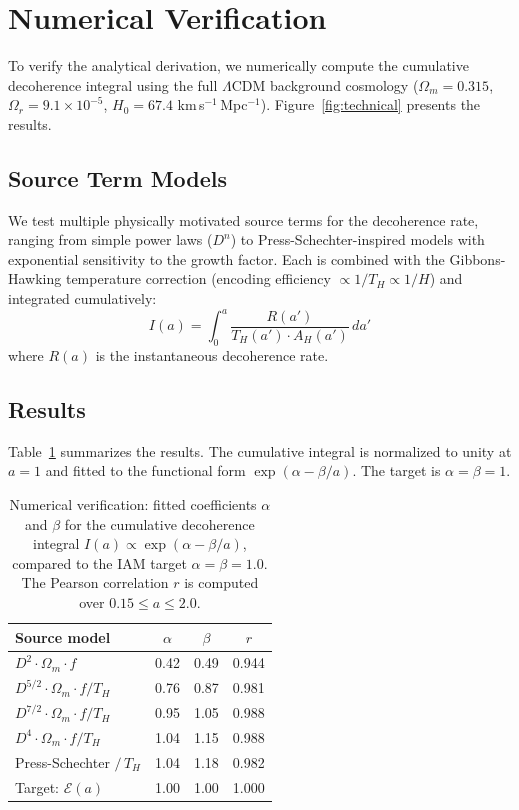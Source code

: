 \documentclass[twocolumn,superscriptaddress,prl,amsmath,amssymb]{revtex4-2}
\begin{document}
\section{Numerical Verification}
\label{sec:numerical}

To verify the analytical derivation, we numerically compute the cumulative decoherence integral using the full $\Lambda$CDM background cosmology ($\Omega_m = 0.315$, $\Omega_r = 9.1 \times 10^{-5}$, $H_0 = 67.4$ km\,s$^{-1}$\,Mpc$^{-1}$). Figure~\ref{fig:technical} presents the results.

\subsection{Source Term Models}

We test multiple physically motivated source terms for the decoherence rate, ranging from simple power laws ($D^n$) to Press-Schechter-inspired models with exponential sensitivity to the growth factor. Each is combined with the Gibbons-Hawking temperature correction (encoding efficiency $\propto 1/T_H \propto 1/H$) and integrated cumulatively:
\begin{equation}
I(a) = \int_0^a \frac{R(a')}{T_H(a') \cdot A_H(a')} \, da'
\end{equation}
where $R(a)$ is the instantaneous decoherence rate.

\subsection{Results}

Table~\ref{tab:results} summarizes the results. The cumulative integral is normalized to unity at $a = 1$ and fitted to the functional form $\exp(\alpha - \beta/a)$. The target is $\alpha = \beta = 1$.

\begin{table}[h]
\centering
\caption{Numerical verification: fitted coefficients $\alpha$ and $\beta$ for the cumulative decoherence integral $I(a) \propto \exp(\alpha - \beta/a)$, compared to the IAM target $\alpha = \beta = 1.0$. The Pearson correlation $r$ is computed over $0.15 \leq a \leq 2.0$.}
\begin{tabular}{lccc}
\hline
Source model & $\alpha$ & $\beta$ & $r$ \\
\hline
$D^2 \cdot \Omega_m \cdot f$ & 0.42 & 0.49 & 0.944 \\
$D^{5/2} \cdot \Omega_m \cdot f / T_H$ & 0.76 & 0.87 & 0.981 \\
$D^{7/2} \cdot \Omega_m \cdot f / T_H$ & 0.95 & 1.05 & 0.988 \\
$D^4 \cdot \Omega_m \cdot f / T_H$ & 1.04 & 1.15 & 0.988 \\
Press-Schechter $/\, T_H$ & 1.04 & 1.18 & 0.982 \\
\hline
Target: $\mathcal{E}(a)$ & 1.00 & 1.00 & 1.000 \\
\hline
\end{tabular}
\label{tab:results}
\end{table}
\end{document}
